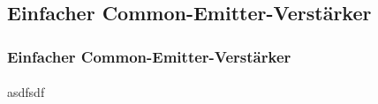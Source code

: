 \subsection{Einfacher Common-Emitter-Verstärker} %
\label{sub:Einfacher_Common-Emitter-Verstärker}
\begin{frame}
    \frametitle{Einfacher Common-Emitter-Verstärker}
    \framesubtitle{}
    asdfsdf
\end{frame}
